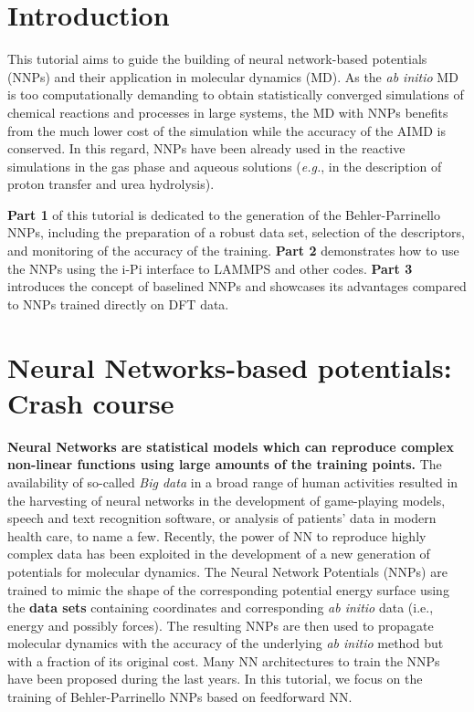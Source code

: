 \documentclass[12pt]{article}
\begin{document}

\newpage
\tableofcontents

\newpage
\pagestyle{fancy}
\renewcommand\headrulewidth{1pt}
\renewcommand\footrulewidth{1pt}
\fancyfoot[C]{\thepage}
\fancyfoot[R]{\today}
\section{Introduction}
This tutorial aims to guide the building of neural network-based potentials (NNPs) and their application in molecular dynamics (MD). As the \textit{ab initio} MD is too computationally demanding to obtain statistically converged simulations of chemical reactions and processes in large systems, the MD with NNPs benefits from the much lower cost of the simulation while the accuracy of the AIMD is conserved.  
In this regard, NNPs have been already used in the reactive simulations in the gas phase and aqueous solutions (\textit{e.g.}, in the description of proton transfer and urea hydrolysis). 

\textbf{Part 1} of this tutorial is dedicated to the generation of the Behler-Parrinello NNPs, including the preparation of a robust data set, selection of the descriptors, and monitoring of the accuracy of the training. \textbf{Part 2} demonstrates how to use the NNPs using the i-Pi interface to LAMMPS and other codes. \textbf{Part 3} introduces the concept of baselined NNPs and showcases its advantages compared to NNPs trained directly on DFT data. 

\section{Neural Networks-based potentials: Crash course}

\textbf{Neural Networks are statistical models which can reproduce complex non-linear functions using large amounts of the training points.} The availability of so-called \textit{Big data} in a broad range of human activities resulted in the harvesting of neural networks in the development of game-playing models, speech and text recognition software, or analysis of patients' data in modern health care, to name a few. Recently, the power of NN to reproduce highly complex data has been exploited in the development of a new generation of potentials for molecular dynamics. The Neural Network Potentials (NNPs) are trained to mimic the shape of the corresponding potential energy surface using the \textbf{data sets} containing coordinates and corresponding \textit{ab initio} data (i.e., energy and possibly forces). The resulting NNPs are then used to propagate molecular dynamics with the accuracy of the underlying \textit{ab initio} method but with a fraction of its original cost. Many NN architectures to train the NNPs have been proposed during the last years. In this tutorial, we focus on the training of Behler-Parrinello NNPs based on feedforward NN.  
\end{document}
